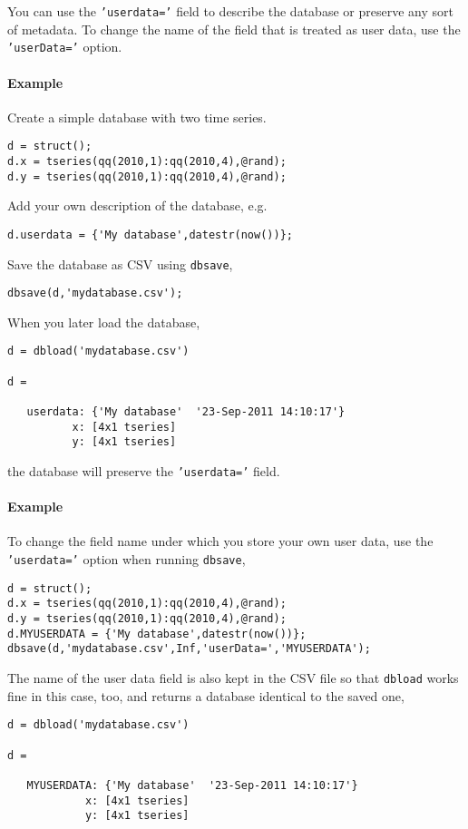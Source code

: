 You can use the \texttt{'userdata='} field to describe the database or
preserve any sort of metadata. To change the name of the field that is
treated as user data, use the \texttt{'userData='} option.

\paragraph{Example}

Create a simple database with two time series.

\begin{verbatim}
d = struct();
d.x = tseries(qq(2010,1):qq(2010,4),@rand);
d.y = tseries(qq(2010,1):qq(2010,4),@rand);
\end{verbatim}

Add your own description of the database, e.g.

\begin{verbatim}
d.userdata = {'My database',datestr(now())};
\end{verbatim}

Save the database as CSV using \texttt{dbsave},

\begin{verbatim}
dbsave(d,'mydatabase.csv');
\end{verbatim}

When you later load the database,

\begin{verbatim}
d = dbload('mydatabase.csv')

d = 

   userdata: {'My database'  '23-Sep-2011 14:10:17'}
          x: [4x1 tseries]
          y: [4x1 tseries]
\end{verbatim}

the database will preserve the \texttt{'userdata='} field.

\paragraph{Example}

To change the field name under which you store your own user data, use
the \texttt{'userdata='} option when running \texttt{dbsave},

\begin{verbatim}
d = struct();
d.x = tseries(qq(2010,1):qq(2010,4),@rand);
d.y = tseries(qq(2010,1):qq(2010,4),@rand);
d.MYUSERDATA = {'My database',datestr(now())};
dbsave(d,'mydatabase.csv',Inf,'userData=','MYUSERDATA');
\end{verbatim}

The name of the user data field is also kept in the CSV file so that
\texttt{dbload} works fine in this case, too, and returns a database
identical to the saved one,

\begin{verbatim}
d = dbload('mydatabase.csv')

d = 

   MYUSERDATA: {'My database'  '23-Sep-2011 14:10:17'}
            x: [4x1 tseries]
            y: [4x1 tseries]
\end{verbatim}


